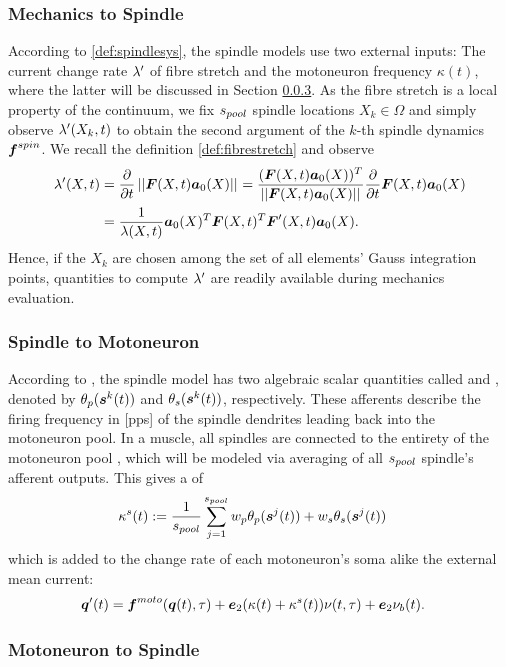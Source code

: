 \subsubsection{Mechanics to Spindle}
According to \ref{def:spindlesys}, the spindle models use two external inputs:
The current change rate $\lambda'$ of fibre stretch and the motoneuron frequency $\kappa(t)$, where the latter will be discussed in Section
\ref{subsec:moto_spindle}.
As the fibre stretch is a local property of the continuum, we fix ${s_{pool}}$ spindle locations $X_k\in\Omega$ and simply observe $\lambda'(X_k,t)$ to obtain the second
argument of the $k$-th spindle dynamics $\boldsymbol{f}^{spin}$.
We recall the definition \ref{def:fibrestretch} and observe 
\begin{align*}
	\lambda'(X,t) &= \frac{\partial }{\partial t}\left|\left|\boldsymbol{F}(X,t)\boldsymbol{a}_0(X)\right|\right|_{} = \frac{(\boldsymbol{F}(X,t)\boldsymbol{a}_0(X))^T}{\left|\left|\boldsymbol{F}(X,t)\boldsymbol{a}_0(X)\right|\right|_{}}\frac{\partial }{\partial t}\boldsymbol{F}(X,t)\boldsymbol{a}_0(X)\\
	  &= \frac{1}{\lambda(X,t)}\boldsymbol{a}_0(X)^T\boldsymbol{F}(X,t)^T\boldsymbol{F}'(X,t)\boldsymbol{a}_0(X).
\end{align*}
Hence, if the $X_k$ are chosen among the set of all elements' Gauss integration points, quantities to compute $\lambda'$ are readily available during mechanics evaluation.

\subsubsection{Spindle to Motoneuron}
According to \cite{Mileusnic2006}, the spindle model has two algebraic scalar quantities called  and ,
denoted by $\theta_p(\boldsymbol{s}^k(t))$ and $\theta_s(\boldsymbol{s}^k(t))$, respectively.
These afferents describe the firing frequency in [pps] of the spindle dendrites leading back into the motoneuron pool.
In a muscle, all spindles are connected to the entirety of the motoneuron pool , which will be modeled via averaging of all ${s_{pool}}$ spindle's afferent outputs.
This gives a  of
\begin{align}
	\kappa^s(t) &:= \frac{1}{{s_{pool}}}\sum\limits_{j=1}^{{s_{pool}}} w_p\theta_p(\boldsymbol{s}^j(t)) + w_s\theta_s(\boldsymbol{s}^j(t))
\end{align}
which is added to the change rate of each motoneuron's soma alike the external mean current:
\begin{align}
	\boldsymbol{q}'(t) &= \boldsymbol{f}^{moto}(\boldsymbol{q}(t),\tau) + \boldsymbol{e}_2(\kappa(t) + \kappa^s(t))\nu(t,\tau) + \boldsymbol{e}_2\nu_b(t).
\end{align}    

\subsubsection{Motoneuron to Spindle}\label{subsec:moto_spindle}
